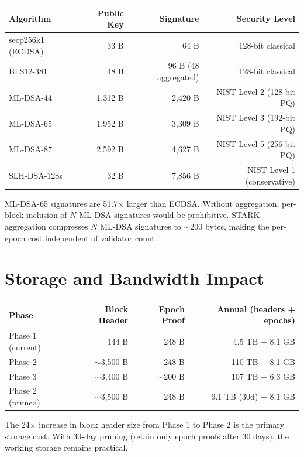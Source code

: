 \documentclass[11pt,a4paper]{article}
\begin{document}
\begin{center}
\begin{tabular}{lrrr}
\toprule
\textbf{Algorithm} & \textbf{Public Key} & \textbf{Signature} & \textbf{Security Level} \\
\midrule
secp256k1 (ECDSA) & 33 B & 64 B & 128-bit classical \\
BLS12-381 & 48 B & 96 B (48 aggregated) & 128-bit classical \\
ML-DSA-44 & 1,312 B & 2,420 B & NIST Level 2 (128-bit PQ) \\
ML-DSA-65 & 1,952 B & 3,309 B & NIST Level 3 (192-bit PQ) \\
ML-DSA-87 & 2,592 B & 4,627 B & NIST Level 5 (256-bit PQ) \\
SLH-DSA-128s & 32 B & 7,856 B & NIST Level 1 (conservative) \\
\bottomrule
\end{tabular}
\end{center}

ML-DSA-65 signatures are 51.7$\times$ larger than ECDSA. Without aggregation, per-block inclusion of $N$ ML-DSA signatures would be prohibitive. STARK aggregation compresses $N$ ML-DSA signatures to $\sim$200 bytes, making the per-epoch cost independent of validator count.

\section{Storage and Bandwidth Impact}

\begin{center}
\begin{tabular}{lrrr}
\toprule
\textbf{Phase} & \textbf{Block Header} & \textbf{Epoch Proof} & \textbf{Annual (headers + epochs)} \\
\midrule
Phase 1 (current) & 144 B & 248 B & 4.5 TB + 8.1 GB \\
Phase 2 & $\sim$3,500 B & 248 B & 110 TB + 8.1 GB \\
Phase 3 & $\sim$3,400 B & $\sim$200 B & 107 TB + 6.3 GB \\
Phase 2 (pruned) & $\sim$3,500 B & 248 B & 9.1 TB (30d) + 8.1 GB \\
\bottomrule
\end{tabular}
\end{center}

The 24$\times$ increase in block header size from Phase 1 to Phase 2 is the primary storage cost. With 30-day pruning (retain only epoch proofs after 30 days), the working storage remains practical.
\end{document}
